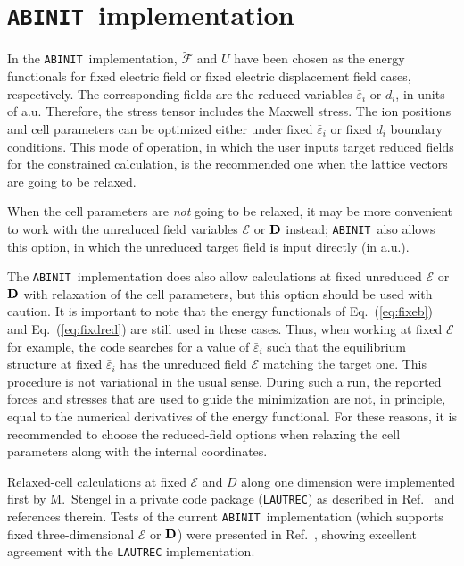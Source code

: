 \documentclass[11pt,fleqn]{article}
\def\E{\mathcal{E}}
\def\EE{\bm{\E}}
\def\D{{\bf D}}
\def\ee{{\varepsilon}}
\def\eb{\bar{\ee}}
\def\F{\mathcal{F}}
\def\Ft{{\widetilde{\F}}}
\def\ABINIT{{{\tt ABINIT}}}
\begin{document}
\section{\ABINIT\ implementation}

In the \ABINIT\ implementation, $\Ft$ and $U$ have been chosen as
the energy functionals for fixed electric field or fixed electric
displacement field cases, respectively. The corresponding
fields are the reduced variables $\eb_i$ or $d_i$, in
units of a.u.  Therefore, the stress tensor includes the Maxwell
stress. The ion positions and cell parameters can be optimized
either under fixed $\eb_i$ or fixed $d_i$ boundary conditions.
This mode of operation, in which the user inputs target reduced
fields for the constrained calculation, is the recommended one
when the lattice vectors are going to be relaxed.

When the cell parameters are \textit{not} going to be relaxed, it
may be more convenient to work with the unreduced field variables
$\EE$ or $\D$ instead; \ABINIT\ also allows this option, in which
the unreduced target field is input directly (in a.u.).

The \ABINIT\ implementation does also allow calculations at fixed
unreduced $\EE$ or $\D$ with relaxation of the cell parameters,
but this option should be used with caution.  It is important to
note that the energy functionals of Eq.~(\ref{eq:fixeb})
and Eq.~(\ref{eq:fixdred}) are still used in these cases.
Thus, when working at fixed $\EE$ for example, the code
searches for a value of $\eb_i$ such that the equilibrium
structure at fixed $\eb_i$ has the unreduced field $\EE$ matching
the target one.  This procedure is not variational in the usual
sense.  During such a run, the reported forces and
stresses that are used to guide the minimization are not, in
principle, equal to the numerical derivatives of the energy
functional.  For these reasons, it is recommended to choose
the reduced-field options when relaxing the cell parameters
along with the internal coordinates.

Relaxed-cell calculations at fixed $\E$ and $D$ along
one dimension were implemented first by M.~Stengel in a private
code package ({\tt LAUTREC}) as described in Ref.~\cite{ssv}
and references therein.  Tests of the current \ABINIT\
implementation (which supports fixed three-dimensional $\EE$ or
$\D$) were presented in Ref.~\cite{hv}, showing excellent agreement
with the {\tt LAUTREC} implementation.
\end{document}

